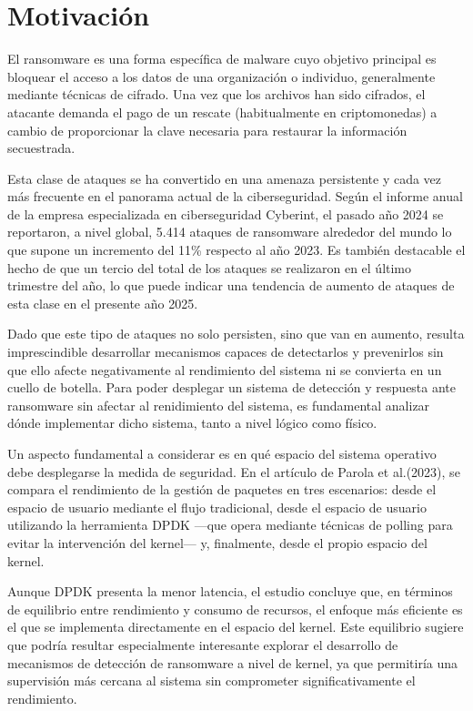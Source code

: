 \section{Motivación}
El ransomware es una forma específica de malware cuyo objetivo principal es bloquear el acceso a los datos de una organización o individuo, generalmente mediante técnicas de cifrado. Una vez que los archivos han sido cifrados, el atacante demanda el pago de un rescate (habitualmente en criptomonedas) a cambio de proporcionar la clave necesaria para restaurar la información secuestrada\cite{NISTransomware2023}.

Esta clase de ataques se ha convertido en una amenaza persistente y cada vez más frecuente en el panorama actual de la ciberseguridad. Según el informe anual de la empresa especializada en ciberseguridad Cyberint\cite{Bleih2025}, el pasado año 2024 se reportaron, a nivel global, 5.414 ataques de ransomware alrededor del mundo lo que supone un incremento del 11\% respecto al año 2023. Es también destacable el hecho de que un tercio del total de los ataques se realizaron en el último trimestre del año, lo que puede indicar una tendencia de aumento de ataques de esta clase en el presente año 2025.

Dado que este tipo de ataques no solo persisten, sino que van en aumento, resulta imprescindible desarrollar mecanismos capaces de detectarlos y prevenirlos sin que ello afecte negativamente al rendimiento del sistema ni se convierta en un cuello de botella. Para poder desplegar un sistema de detección y respuesta ante ransomware sin afectar al renidimiento del sistema, es fundamental analizar dónde implementar dicho sistema, tanto a nivel lógico como físico.

Un aspecto fundamental a considerar es en qué espacio del sistema operativo debe desplegarse la medida de seguridad. En el artículo de Parola et al.(2023)\cite{Parola2023}, se compara el rendimiento de la gestión de paquetes en tres escenarios: desde el espacio de usuario mediante el flujo tradicional, desde el espacio de usuario utilizando la herramienta DPDK —que opera mediante técnicas de polling para evitar la intervención del kernel— y, finalmente, desde el propio espacio del kernel.

Aunque DPDK presenta la menor latencia, el estudio concluye que, en términos de equilibrio entre rendimiento y consumo de recursos, el enfoque más eficiente es el que se implementa directamente en el espacio del kernel. Este equilibrio sugiere que podría resultar especialmente interesante explorar el desarrollo de mecanismos de detección de ransomware a nivel de kernel, ya que permitiría una supervisión más cercana al sistema sin comprometer significativamente el rendimiento.

